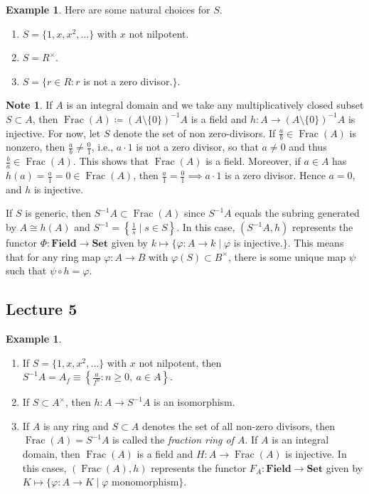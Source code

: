 \documentclass[10pt,letterpaper,cm]{nupset}
\theoremstyle{definition}
\newtheorem{exmp}[definition]{Example}
\newtheorem{note}[definition]{Note}
\theoremstyle{theorem}
\theoremstyle{remark}
\newcommand{\1}{\mathbf{1}}
\newcommand{\0}{\vec 0}
\DeclareMathOperator{\Frac}{Frac}
\begin{document}
\begin{exmp}
Here are some natural choices for $S$.
\begin{enumerate}[label=(\alph*)]
\item $S = \{1, x, x^2, \ldots \}$ with $x$ not nilpotent.
\item $S = R^{\times}$.
\item $S = \{r\in R : r$ is not a zero divisor.$\}$.
\end{enumerate}
\end{exmp}

\begin{note}
If $A$ is an integral domain and we take any multiplicatively closed subset $S\subset A$, then $\Frac(A)\coloneqq  (A \setminus \{0\})^{-1}A$ is a field and $h : A \to (A \setminus \{0\})^{-1}A$ is injective. For now, let $S$ denote the set of non zero-divisors.  If $\frac{a}{b} \in \Frac(A)$ is nonzero, then $\frac{a}{b} \ne \frac{0}{1}$, i.e., $a\cdot 1$ is not a zero divisor, so that $a\ne 0$ and thus $\frac{b}{a} \in \Frac(A)$. This shows that $\Frac(A)$ is a field. Moreover, if $a\in A$ has $h(a) = \frac{a}{1} = 0\in \Frac(A)$, then $\frac{a}{1}= \frac{0}{1} \implies a\cdot 1$ is a zero divisor. Hence $a=0$, and $h$ is injective. 

If $S$ is generic, then $S^{-1}A \subset \Frac(A)$ since $S^{-1}A$ equals the subring generated by $A\cong h(A)$ and $S^{-1} = \left\{\frac{1}{s}\mid s\in S\right\}$. In this case, $(S^{-1}A, h)$ represents the functor $\Phi : \mathbf{Field} \to \mathbf{Set}$ given by $k \mapsto \{\varphi : A \to k \mid \varphi$ is injective.$\}$. This means that for any ring map $\varphi: A \to B$ with $\varphi(S) \subset B^{\times}$, there is some unique map $\psi$ such that $\psi \circ h = \varphi$.
\end{note}

\subsection{Lecture 5}

\begin{exmp} $ $
\begin{enumerate}
\item If  $S = \{1, x, x^2, \ldots \}$ with $x$ not nilpotent, then $S^{-1}A = A_f \equiv \left\{\frac{a}{f^n} : n\geq 0, \ a \in A\right\} $.
\item If $S \subset A^{\times}$, then $h: A \to S^{-1}A$ is an isomorphism. 
\item If $A$ is any ring and $S\subset A$ denotes the set of all non-zero divisors, then $\Frac(A) = S^{-1}A$ is called the \textit{fraction ring of $A$}. If $A$ is an integral domain, then $\Frac(A)$ is a field and $H : A \to \Frac(A)$ is injective. In this cases, $(\Frac(A), h)$ represents the functor $F_A : \mathbf{Field} \to \mathbf{Set}$ given by $K \mapsto \{\varphi: A \to K \mid \varphi \text{ monomorphism}\}$. 
\end{enumerate}
\end{exmp}
\end{document}
